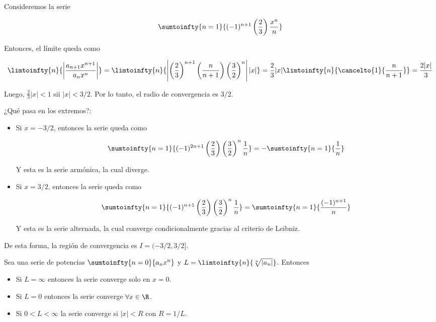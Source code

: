 \begin{ejem}
    Consideremos la serie
    
    \[
    \sumtoinfty{n=1}{(-1)^{n+1} \left(\frac{2}{3}\right) \frac{x^n}{n}}
    \]
    
    Entonces, el límite queda como
    
    \[
    \limtoinfty{n}{\left|\frac{a_{n+1}x^{n+1}}{a_nx^n}\right|} = \limtoinfty{n}{\left| \left(\frac{2}{3}\right)^{n+1}\left(\frac{n}{n+1}\right)\left(\frac{3}{2}\right)^n \right||x|} = \frac{2}{3}|x|\limtoinfty{n}{\cancelto{1}{\frac{n}{n+1}}} = \frac{2|x|}{3}
    \]
    
    Luego, $\frac{2}{3}|x| < 1$ sii $|x| < 3/2$. Por lo tanto, el radio de convergencia es $3/2$.
    
    ¿Qué pasa en los extremos?:
    
    \begin{itemize}
        \item Si $x = -3/2$, entonces la serie queda como
        
        \[
        \sumtoinfty{n=1}{(-1)^{2n+1} \left(\frac{2}{3}\right) \left(\frac{3}{2}\right)^n \frac{1}{n}} = -\sumtoinfty{n=1}{\frac{1}{n}}
        \]
        
        Y esta es la serie armónica, la cual diverge.
        
        \item Si $x = 3/2$, entonces la serie queda como
        
        \[
        \sumtoinfty{n=1}{(-1)^{n+1} \left(\frac{2}{3}\right) \left(\frac{3}{2}\right)^n \frac{1}{n}} = \sumtoinfty{n=1}{\frac{(-1)^{n+1}}{n}}
        \]
        
        Y esta es la serie alternada, la cual converge condicionalmente gracias al criterio de Leibniz.
    \end{itemize}
    
    De esta forma, la región de convergencia es $I = (-3/2, 3/2]$.
\end{ejem}

\begin{teo}\label{teo:raiz}
    Sea una serie de potencias $\sumtoinfty{n=0}{a_nx^n}$ y $L = \limtoinfty{n}{\sqrt[n]{|a_n|}}$. Entonces
    
    \begin{itemize}
        \item Si $L = \infty$ entonces la serie converge solo en $x=0$.
        \item Si $L=0$ entonces la serie converge $\forall x \in \R$.
        \item Si $0 < L < \infty$ la serie converge si $|x|<R$ con $R=1/L$.
    \end{itemize}
\end{teo}

